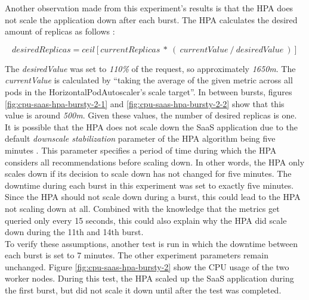 Another observation made from this experiment's results is that the HPA does not scale the application down after each burst. The HPA calculates the desired amount of replicas as follows \citep{hpa-algorithm-details}:

\[ desiredReplicas = ceil[currentReplicas\ *\ (\ currentValue\ /\ desiredValue\ )] \]

The \textit{desiredValue} was set to \textit{110\%} of the request, so approximately \textit{1650m}. The \textit{currentValue} is calculated by ``taking the average of the given metric across all pods in the HorizontalPodAutoscaler's scale target''\citep{hpa-algorithm-details}. In between bursts, figures \ref{fig:cpu-saas-hpa-bursty-2-1} and \ref{fig:cpu-saas-hpa-bursty-2-2} show that this value is around \textit{500m}. Given these values, the number of desired replicas is one.\\

It is possible that the HPA does not scale down the SaaS application due to the default \textit{downscale stabilization} parameter of the HPA algorithm being five minutes \citep{hpa-cooldown-delay}. This parameter specifies a period of time during which the HPA considers all recommendations before scaling down. In other words, the HPA only scales down if its decision to scale down has not changed for five minutes. The downtime during each burst in this experiment was set to exactly five minutes. Since the HPA should not scale down during a burst, this could lead to the HPA not scaling down at all. Combined with the knowledge that the metrics get queried only every 15 seconds, this could also explain why the HPA did scale down during the 11th and 14th burst. \\

To verify these assumptions, another test is run in which the downtime between each burst is set to 7 minutes. The other experiment parameters remain unchanged. Figure \ref{fig:cpu-saas-hpa-bursty-2} show the CPU usage of the two worker nodes. During this test, the HPA scaled up the SaaS application during the first burst, but did not scale it down until after the test was completed.  \\


